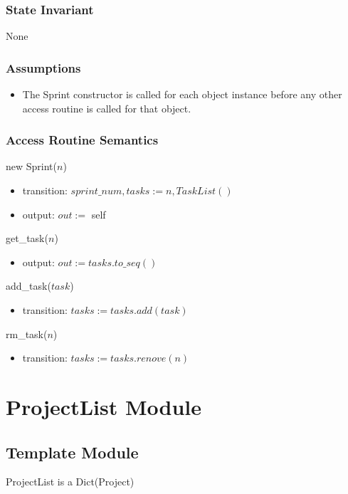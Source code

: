 \documentclass[12pt, titlepage]{article}
\begin{document}
\subsubsection*{State Invariant}
None

\subsubsection*{Assumptions}
\begin{itemize}
  \item The Sprint constructor is called for each object instance before any other access routine is called for that object.
\end{itemize}

\subsubsection*{Access Routine Semantics}
\noindent new Sprint($n$)
\begin{itemize}
    \item transition: $sprint\_num, tasks := n, TaskList()$
    \item output: $out :=$ self
\end{itemize}

\noindent get\_task($n$)
\begin{itemize}
    \item output: $out := tasks.to\_seq()$
\end{itemize}

\noindent add\_task($task$)
\begin{itemize}
    \item transition: $tasks := tasks.add(task)$
\end{itemize}

\noindent rm\_task($n$)
\begin{itemize}
    \item transition: $tasks := tasks.renove(n)$
\end{itemize}

\newpage

\section* {ProjectList Module}

\subsection*{Template Module}
ProjectList is a Dict(Project)
\end{document}
